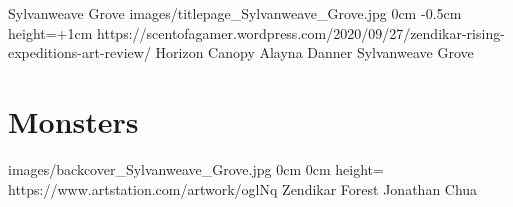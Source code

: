\documentclass[letterpaper,openany,twoside,twocolumn]{book}
\begin{document}
	\regionTitlePage
		{Sylvanweave Grove}
		{images/titlepage_Sylvanweave_Grove.jpg}
		{0cm}
		{-0.5cm}
		{height=\paperheight+1cm}
		{https://scentofagamer.wordpress.com/2020/09/27/zendikar-rising-expeditions-art-review/}
		{Horizon Canopy}
		{Alayna Danner}
		{Sylvanweave Grove}
	
	\tableofcontents
	
	\mainmatter
	
	\MonsterSheetGeometry
	\part{Monsters}
	
	
	\bookLastPage
		{images/backcover_Sylvanweave_Grove.jpg}
		{0cm}
		{0cm}
		{height=\paperheight}
		{https://www.artstation.com/artwork/oglNq}
		{Zendikar Forest}
		{Jonathan Chua}
		{}
\end{document}
